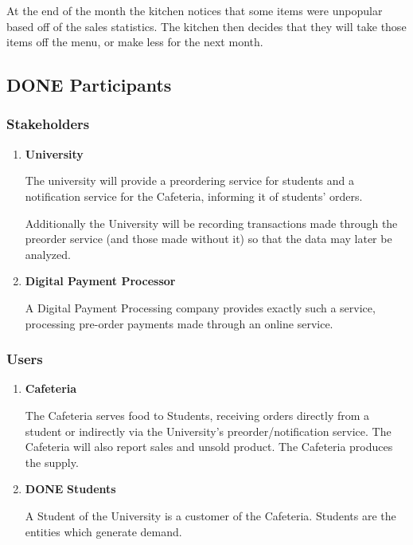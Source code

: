 \documentclass[11pt]{article}
\begin{document}
At the end of the month the kitchen notices that some items were
unpopular based off of the sales statistics. The kitchen then
decides that they will take those items off the menu, or make less
for the next month.
\subsection{{\bfseries\sffamily DONE} Participants}
\label{sec:org231963c}
\subsubsection{Stakeholders}
\label{sec:orga1d593e}
\begin{enumerate}
\item \textbf{University}
\label{sec:org04fe1b4}

The university will provide a preordering service for students
and a notification service for the Cafeteria, informing it of
students' orders.

Additionally the University will be recording transactions made
through the preorder service (and those made without it) so that
the data may later be analyzed.

\item \textbf{Digital Payment Processor}
\label{sec:org5739f76}

A Digital Payment Processing company provides exactly such a
service, processing pre-order payments made through an online
service.
\end{enumerate}

\subsubsection{Users}
\label{sec:orga5b7652}
\begin{enumerate}
\item \textbf{Cafeteria}
\label{sec:org1d772aa}

The Cafeteria serves food to Students, receiving orders directly
from a student or indirectly via the University's
preorder/notification service. The Cafeteria will also report
sales and unsold product. The Cafeteria produces the supply.

\item {\bfseries\sffamily DONE} \textbf{Students}
\label{sec:org275c468}

A Student of the University is a customer of the
Cafeteria. Students are the entities which generate demand.
\end{enumerate}
\end{document}
